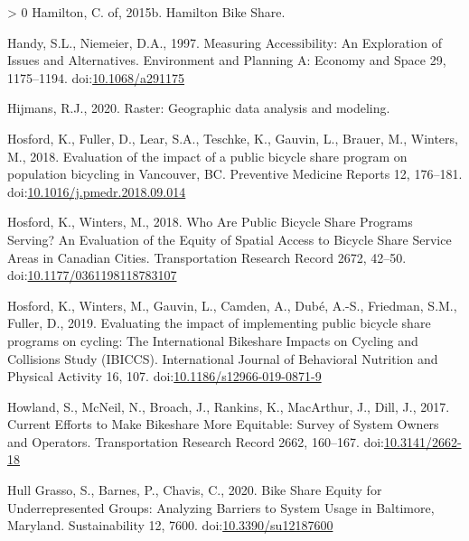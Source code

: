 \documentclass[]{elsarticle} %
\newlength{\cslhangindent}
\newenvironment{CSLReferences}[3] %
 {%
  \setlength{\parindent}{0pt}
  \ifodd #1 \everypar{\setlength{\hangindent}{\cslhangindent}}\ignorespaces\fi
  \ifnum #2 > 0
  \setlength{\parskip}{#2\baselineskip}
  \fi
 }%
 {}
\begin{document}
\begin{CSLReferences}{1}{0}
\leavevmode\hypertarget{ref-hamiltonHamiltonBikeShare2015}{}%
Hamilton, C. of, 2015b. Hamilton {Bike Share}.

\leavevmode\hypertarget{ref-handyMeasuringAccessibilityExploration1997}{}%
Handy, S.L., Niemeier, D.A., 1997. Measuring {Accessibility}: {An
Exploration} of {Issues} and {Alternatives}. Environment and Planning A:
Economy and Space 29, 1175--1194.
doi:\href{https://doi.org/10.1068/a291175}{10.1068/a291175}

\leavevmode\hypertarget{ref-R-raster}{}%
Hijmans, R.J., 2020. Raster: Geographic data analysis and modeling.

\leavevmode\hypertarget{ref-hosfordEvaluationImpactPublic2018}{}%
Hosford, K., Fuller, D., Lear, S.A., Teschke, K., Gauvin, L., Brauer,
M., Winters, M., 2018. Evaluation of the impact of a public bicycle
share program on population bicycling in {Vancouver}, {BC}. Preventive
Medicine Reports 12, 176--181.
doi:\href{https://doi.org/10.1016/j.pmedr.2018.09.014}{10.1016/j.pmedr.2018.09.014}

\leavevmode\hypertarget{ref-hosfordWhoArePublic2018}{}%
Hosford, K., Winters, M., 2018. Who {Are Public Bicycle Share Programs
Serving}? {An Evaluation} of the {Equity} of {Spatial Access} to
{Bicycle Share Service Areas} in {Canadian Cities}. Transportation
Research Record 2672, 42--50.
doi:\href{https://doi.org/10.1177/0361198118783107}{10.1177/0361198118783107}

\leavevmode\hypertarget{ref-hosfordEvaluatingImpactImplementing2019}{}%
Hosford, K., Winters, M., Gauvin, L., Camden, A., Dubé, A.-S., Friedman,
S.M., Fuller, D., 2019. Evaluating the impact of implementing public
bicycle share programs on cycling: The {International Bikeshare Impacts}
on {Cycling} and {Collisions Study} ({IBICCS}). International Journal of
Behavioral Nutrition and Physical Activity 16, 107.
doi:\href{https://doi.org/10.1186/s12966-019-0871-9}{10.1186/s12966-019-0871-9}

\leavevmode\hypertarget{ref-howlandCurrentEffortsMake2017}{}%
Howland, S., McNeil, N., Broach, J., Rankins, K., MacArthur, J., Dill,
J., 2017. Current {Efforts} to {Make Bikeshare More Equitable}: {Survey}
of {System Owners} and {Operators}. Transportation Research Record 2662,
160--167. doi:\href{https://doi.org/10.3141/2662-18}{10.3141/2662-18}

\leavevmode\hypertarget{ref-hullgrassoBikeShareEquity2020}{}%
Hull Grasso, S., Barnes, P., Chavis, C., 2020. Bike {Share Equity} for
{Underrepresented Groups}: {Analyzing Barriers} to {System Usage} in
{Baltimore}, {Maryland}. Sustainability 12, 7600.
doi:\href{https://doi.org/10.3390/su12187600}{10.3390/su12187600}


\end{CSLReferences}
\end{document}
